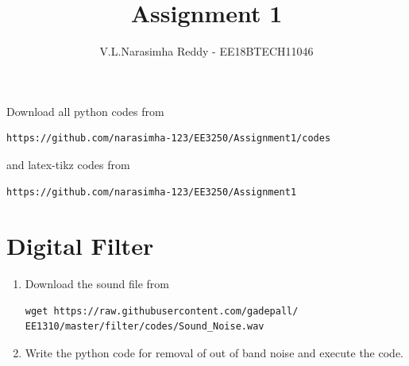 \documentclass[journal,12pt,twocolumn]{IEEEtran}
\renewcommand\thesection{\arabic{section}}
\begin{document}
\def\putbox#1#2#3{\makebox[0in][l]{\makebox[#1][l]{}\raisebox{\baselineskip}[0in][0in]{\raisebox{#2}[0in][0in]{#3}}}}
     \def\rightbox#1{\makebox[0in][r]{#1}}
     \def\centbox#1{\makebox[0in]{#1}}
     \def\topbox#1{\raisebox{-\baselineskip}[0in][0in]{#1}}
     \def\midbox#1{\raisebox{-0.5\baselineskip}[0in][0in]{#1}}
\vspace{3cm}
\title{Assignment 1}
\author{V.L.Narasimha Reddy - EE18BTECH11046}
\maketitle
\newpage
\renewcommand{\thefigure}{\theenumi}
\renewcommand{\thetable}{\theenumi}
\bigskip
Download all python codes from 
\begin{lstlisting}
https://github.com/narasimha-123/EE3250/Assignment1/codes
\end{lstlisting}
%
and latex-tikz codes from 
%
\begin{lstlisting}
https://github.com/narasimha-123/EE3250/Assignment1
\end{lstlisting}
\section{Digital Filter}
\begin{enumerate}[label=\thesection.\arabic*
,ref=\thesection.\theenumi]
\item
\label{prob:input}
Download the sound file from  
\begin{lstlisting}
wget https://raw.githubusercontent.com/gadepall/ 
EE1310/master/filter/codes/Sound_Noise.wav
\end{lstlisting}
\item
\label{prob:output}
Write the python code for removal of out of band noise and execute the code.
\\
\solution


\end{enumerate}
\end{document}
